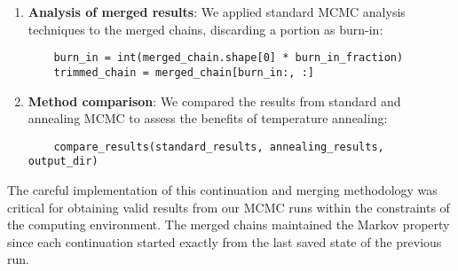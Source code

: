 \documentclass[11pt]{article}
\theoremstyle{definition}
\begin{document}
\begin{enumerate}
  \item \textbf{Analysis of merged results}: We applied standard MCMC analysis techniques to the merged chains, discarding a portion as burn-in:
  
  \begin{verbatim}
    burn_in = int(merged_chain.shape[0] * burn_in_fraction)
    trimmed_chain = merged_chain[burn_in:, :]
  \end{verbatim}
  
  \item \textbf{Method comparison}: We compared the results from standard and annealing MCMC to assess the benefits of temperature annealing:
  
  \begin{verbatim}
    compare_results(standard_results, annealing_results, output_dir)
  \end{verbatim}
\end{enumerate}

The careful implementation of this continuation and merging methodology was critical for obtaining valid results from our MCMC runs within the constraints of the computing environment. The merged chains maintained the Markov property since each continuation started exactly from the last saved state of the previous run.
\end{document}
